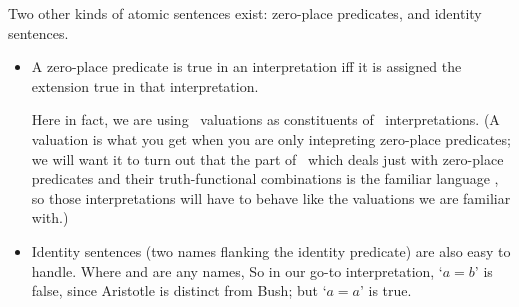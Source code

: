 Two other kinds of atomic sentences exist: zero-place predicates, and identity sentences.

\begin{itemize}
	\item A zero-place predicate is true in an interpretation iff it is assigned the extension true in that interpretation.

	Here in fact, we are using \TFL\ valuations as constituents of \FOL\ interpretations. (A valuation is what you get when you are only intepreting zero-place predicates; we will want it to turn out that the part of \FOL\ which deals just with zero-place predicates and their truth-functional combinations is the familiar language \TFL, so those interpretations will have to behave like the valuations we are familiar with.)
		\item Identity sentences (two names flanking the identity predicate) are also easy to handle. Where  and  are any names, 
So in our go-to interpretation, `$a = b$' is false, since Aristotle is distinct from Bush; but `$a=a$' is true.
\end{itemize}






